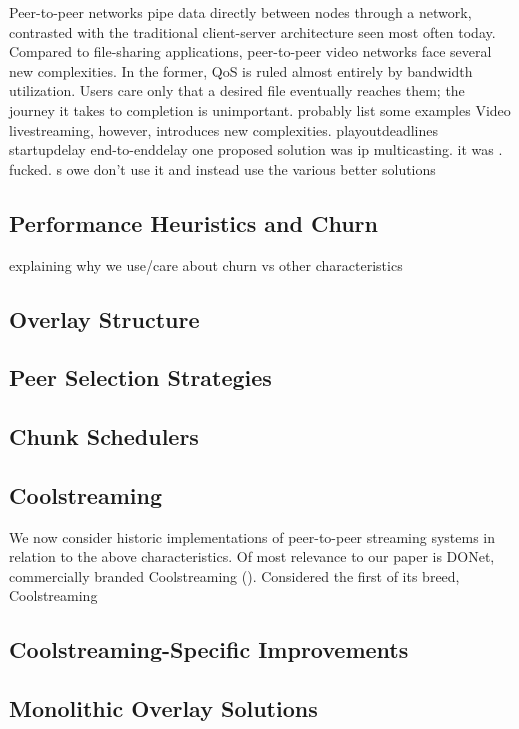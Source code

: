 \documentclass[12pt,a4paper]{article}
\begin{document}
Peer-to-peer networks pipe data directly between nodes through a network, contrasted with the traditional client-server architecture seen most often today.  Compared to file-sharing applications, peer-to-peer video networks face several new complexities. In the former, QoS is ruled almost entirely by bandwidth utilization. Users care only that a desired file eventually reaches them; the journey it takes to completion is unimportant.  probably list some examples Video livestreaming, however, introduces new complexities. playoutdeadlines startupdelay end-to-enddelay
one proposed solution was ip multicasting. it was . fucked. s owe don't use it and instead use the various better solutions
\subsection{Performance Heuristics and Churn} \label{litreview:heuristics}
explaining why we use/care about churn vs other characteristics
\subsection{Overlay Structure} \label{litreview:structure}
\subsection{Peer Selection Strategies} \label{litreview:selection}
\subsection{Chunk Schedulers} \label{litreview:schedulers}
\subsection{Coolstreaming} \label{litreview:coolstreaming}
We now consider historic implementations of peer-to-peer streaming systems in relation to the above characteristics. Of most relevance to our paper is DONet, commercially branded Coolstreaming (\cite{1498486}). Considered the first of its breed, Coolstreaming \cite{Xie2007} \cite{asdasd} \cite{1498486}
\subsection{Coolstreaming-Specific Improvements} \label{litreview:specifics}
\subsection{Monolithic Overlay Solutions} \label{litreview:monoliths}
\end{document}
